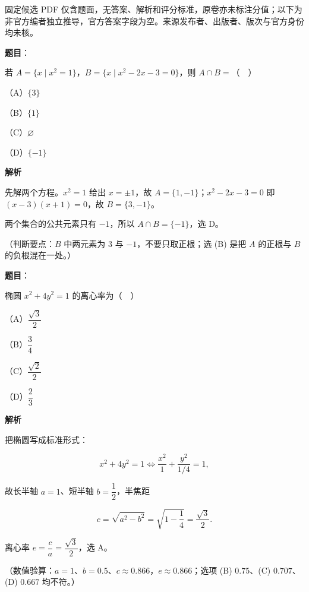

\begin{gktip}
固定候选 PDF 仅含题面，无答案、解析和评分标准，原卷亦未标注分值；以下为非官方编者独立推导，官方答案字段为空。来源发布者、出版者、版次与官方身份均未核。
\end{gktip}

\begin{answer}

\textbf{题目}：

若 $A=\{x\mid x^2=1\}$，$B=\{x\mid x^2-2x-3=0\}$，则 $A\cap B=$（　）

（A）$\{3\}$

（B）$\{1\}$

（C）$\varnothing$

（D）$\{-1\}$

\textbf{解析}

先解两个方程。$x^2=1$ 给出 $x=\pm1$，故 $A=\{1,-1\}$；$x^2-2x-3=0$ 即 $(x-3)(x+1)=0$，故 $B=\{3,-1\}$。

两个集合的公共元素只有 $-1$，所以 $A\cap B=\{-1\}$，选 D。

（判断要点：$B$ 中两元素为 $3$ 与 $-1$，不要只取正根；选 (B) 是把 $A$ 的正根与 $B$ 的负根混在一处。）


\end{answer}
\begin{answer}

\textbf{题目}：

椭圆 $x^2+4y^2=1$ 的离心率为（　）

（A）$\dfrac{\sqrt3}{2}$

（B）$\dfrac34$

（C）$\dfrac{\sqrt2}{2}$

（D）$\dfrac23$

\textbf{解析}

把椭圆写成标准形式：

\nopagebreak[4]
\[x^2+4y^2=1\iff \frac{x^2}{1}+\frac{y^2}{1/4}=1,\]

故长半轴 $a=1$、短半轴 $b=\dfrac12$，半焦距

\nopagebreak[4]
\[c=\sqrt{a^2-b^2}=\sqrt{1-\frac14}=\frac{\sqrt3}{2}.\]

离心率 $e=\dfrac ca=\dfrac{\sqrt3}{2}$，选 A。

（数值验算：$a=1$、$b=0.5$、$c\approx0.866$，$e\approx0.866$；选项 (B) $0.75$、(C) $0.707$、(D) $0.667$ 均不符。）


\end{answer}
